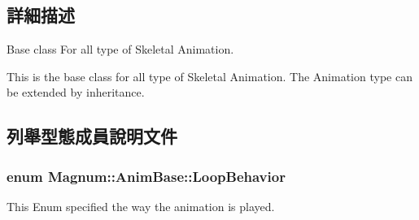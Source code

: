 \subsection{詳細描述}
Base class For all type of Skeletal Animation. 

This is the base class for all type of Skeletal Animation. The Animation type can be extended by inheritance. 

\subsection{列舉型態成員說明文件}
\subsubsection[{\texorpdfstring{Loop\+Behavior}{LoopBehavior}}]{\setlength{\rightskip}{0pt plus 5cm}enum {\bf Magnum\+::\+Anim\+Base\+::\+Loop\+Behavior}}\hypertarget{class_magnum_1_1_anim_base_ad6b3de9518d395df5ca9865f268ec581}{}\label{class_magnum_1_1_anim_base_ad6b3de9518d395df5ca9865f268ec581}


This Enum specified the way the animation is played. 

